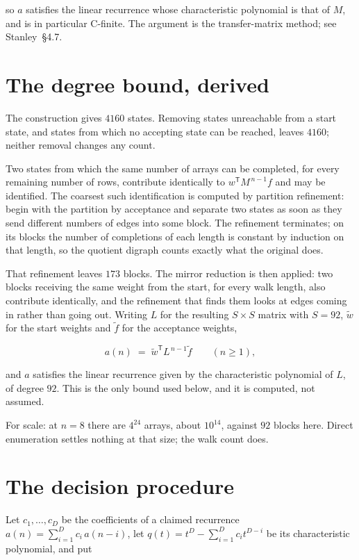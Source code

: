 \documentclass[11pt]{article}
\theoremstyle{definition}
\begin{document}
so $a$ satisfies the linear recurrence whose characteristic polynomial is that of $M$, and is in particular C-finite. The argument is the transfer-matrix method; see Stanley~\S4.7.

\section{The degree bound, derived}

The construction gives $4160$ states. Removing states unreachable from a start state, and states from which no accepting state can be reached, leaves $4160$; neither removal changes any count.

Two states from which the same number of arrays can be completed, for every remaining number of rows, contribute identically to $w^{\mathsf T}M^{\,n-1}f$ and may be identified. The coarsest such identification is computed by partition refinement: begin with the partition by acceptance and separate two states as soon as they send different numbers of edges into some block. The refinement terminates; on its blocks the number of completions of each length is constant by induction on that length, so the quotient digraph counts exactly what the original does.

That refinement leaves $173$ blocks. The mirror reduction is then applied: two blocks receiving the same weight from the start, for every walk length, also contribute identically, and the refinement that finds them looks at edges coming in rather than going out. Writing $L$ for the resulting $S \times S$ matrix with $S = 92$, $\tilde w$ for the start weights and $\tilde f$ for the acceptance weights,

\[a(n) \;=\; \tilde w^{\mathsf T} L^{\,n-1} \tilde f \qquad (n \ge 1),\]

and $a$ satisfies the linear recurrence given by the characteristic polynomial of $L$, of degree $92$. This is the only bound used below, and it is computed, not assumed.

For scale: at $n = 8$ there are $4^{24}$ arrays, about $10^{14}$, against $92$ blocks here. Direct enumeration settles nothing at that size; the walk count does.

\section{The decision procedure}

Let $c_1,\dots,c_D$ be the coefficients of a claimed recurrence $a(n) = \sum_{i=1}^{D} c_i\,a(n-i)$, let $q(t) = t^{D} - \sum_{i=1}^{D} c_i t^{D-i}$ be its characteristic polynomial, and put
\end{document}
